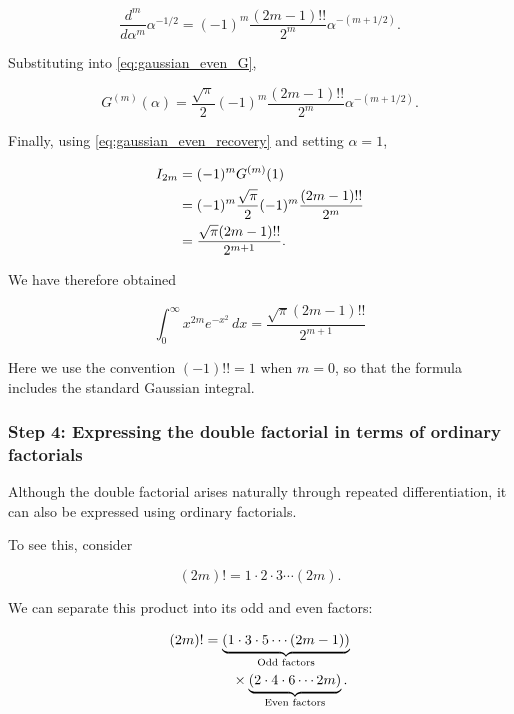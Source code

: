 \documentclass[11pt,a4paper]{article}
\theoremstyle{definition}
\theoremstyle{remark}
\begin{document}
\begin{equation}
    \frac{d^m}{d\alpha^m}
    \alpha^{-1/2}
    =
    (-1)^m
    \frac{(2m-1)!!}{2^m}
    \alpha^{-(m+1/2)}.
    \label{eq:double_factorial_derivative}
\end{equation}

Substituting into
\eqref{eq:gaussian_even_G},

\begin{equation}
    G^{(m)}(\alpha)
    =
    \frac{\sqrt{\pi}}{2}
    (-1)^m
    \frac{(2m-1)!!}{2^m}
    \alpha^{-(m+1/2)}.
    \label{eq:gaussian_G_derivative}
\end{equation}

Finally, using
\eqref{eq:gaussian_even_recovery}
and setting $\alpha=1$,

\begin{align}
    I_{2m}
    &=
    (-1)^m G^{(m)}(1)
    \notag\\
    &=
    (-1)^m
    \frac{\sqrt{\pi}}{2}
    (-1)^m
    \frac{(2m-1)!!}{2^m}
    \notag\\
    &=
    \frac{\sqrt{\pi}(2m-1)!!}
         {2^{m+1}}.
\end{align}

We have therefore obtained

\begin{equation}
    \boxed{
    \int_0^\infty
    x^{2m}e^{-x^2}\,dx
    =
    \frac{\sqrt{\pi}(2m-1)!!}
         {2^{m+1}}
    }
    \label{eq:gaussian_even_result}
\end{equation}

Here we use the convention
$(-1)!!=1$ when $m=0$,
so that the formula includes
the standard Gaussian integral.

\subsubsection*{Step 4: Expressing the double factorial
in terms of ordinary factorials}

Although the double factorial
arises naturally through repeated
differentiation, it can also be
expressed using ordinary factorials.

To see this, consider

\[
    (2m)!
    =
    1\cdot2\cdot3\cdots(2m).
\]

We can separate this product
into its odd and even factors:

\begin{align}
    (2m)!
    &=
    \underbrace{
    (1\cdot3\cdot5\cdots(2m-1))
    }_{\text{Odd factors}}
    \notag\\
    &\qquad\times
    \underbrace{
    (2\cdot4\cdot6\cdots2m)
    }_{\text{Even factors}}.
\end{align}
\end{document}
